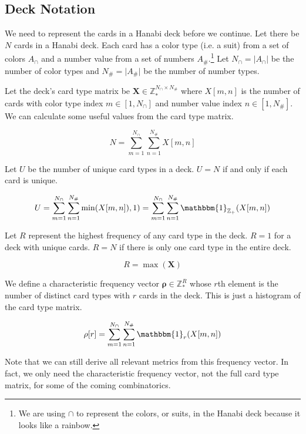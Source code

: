 \documentclass{article}
\begin{document}
\subsection{Deck Notation}

We need to represent the cards in a Hanabi deck before we continue. Let there be $N$ cards in a Hanabi deck. Each card has a color type (i.e. a suit) from a set of colors $A_\cap$ and a number value from a set of numbers $A_\#$.\footnote{We are using $\cap$ to represent the colors, or suits, in the Hanabi deck because it looks like a rainbow.} Let $N_\cap = \lvert A_\cap \rvert$ be the number of color types and $N_\# = \lvert A_\# \rvert$ be the number of number types.

Let the deck's card type matrix be $\bm{X}\in \mathbb{Z}_{*}^{N_\cap \times N_\#}$ where $X[m, n]$ is the number of cards with color type index $m\in [1, N_\cap]$ and number value index $n\in [1, N_\#]$. We can calculate some useful values from the card type matrix.

\begin{equation}
    N = \sum_{m = 1}^{N_\cap} \sum_{n = 1}^{N_\#}X[m, n]
\end{equation} 

Let $U$ be the number of unique card types in a deck. $U=N$ if and only if each card is unique.

\begin{equation}
    U = \sum_{m = 1}^{N_\cap} \sum_{n = 1}^{N_\#} \min(X[m, n]), 1) = \sum_{m = 1}^{N_\cap} \sum_{n = 1}^{N_\#} \mathbbm{1}_{\mathbb{Z}_{+}}(X[m, n])
\end{equation} 

Let $R$ represent the highest frequency of any card type in the deck. $R=1$ for a deck with unique cards. $R=N$ if there is only one card type in the entire deck.

\begin{equation}
    R = \max (\bm{X} )
\end{equation} 

 We define a characteristic frequency vector $\bm{\rho}\in \mathbb{Z}_{*}^{R}$ whose $r$th element is the number of distinct card types with $r$ cards in the deck. This is just a histogram of the card type matrix.
 
\begin{equation}
    \rho[r] = \sum_{m = 1}^{N_\cap} \sum_{n = 1}^{N_\#} \mathbbm{1}_{r}(X[m, n])
\end{equation} 
 
Note that we can still derive all relevant metrics from this frequency vector. In fact, we only need the characteristic frequency vector, not the full card type matrix, for some of the coming combinatorics.
\end{document}
